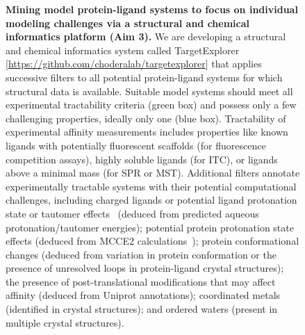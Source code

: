\documentclass[11pt]{article}
\begin{document}
\begin{figure}
\vspace{-0.25in}
\begin{centering}
\vspace{-0.15in}
\end{centering}
\footnotesize
\caption{\label{figure:mining-for-model-systems}  
\textbf{Mining model protein-ligand systems to focus on individual modeling challenges via a structural and chemical informatics platform (Aim 3).}
We are developing a structural and chemical informatics system called TargetExplorer [\url{https://github.com/choderalab/targetexplorer}] that applies successive filters to all potential protein-ligand systems for which structural data is available. 
Suitable model systems should meet all experimental tractability criteria (green box) and possess only a few challenging properties, ideally only one (blue box).
Tractability of experimental affinity measurements includes properties like known ligands with potentially fluorescent scaffolds (for fluorescence competition assays), highly soluble ligands (for ITC), or ligands above a minimal mass (for SPR or MST).
Additional filters annotate experimentally tractable systems with their potential computational challenges, including charged ligands or potential ligand protonation state or tautomer effects~\cite{Martin:2009:JournalofComputer-AidedMolecularDesign} (deduced from predicted aqueous protonation/tautomer energies); potential protein protonation state effects (deduced from MCCE2 calculations~\cite{Song:2009:JournalofComputationalChemistry}); protein conformational changes (deduced from variation in protein conformation or the presence of unresolved loops in protein-ligand crystal structures); the presence of post-translational modifications that may affect affinity (deduced from Uniprot annotations); coordinated metals (identified in crystal structures); and ordered waters (present in multiple crystal structures).
}
\end{figure}
\end{document}
